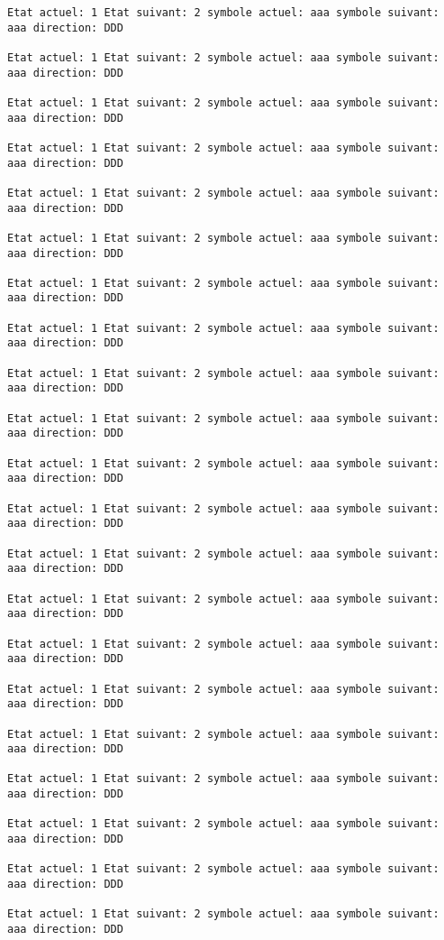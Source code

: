 \documentclass{article}
\begin{document}
\begin{verbatim}
Etat actuel: 1 Etat suivant: 2 symbole actuel: aaa symbole suivant: aaa direction: DDD

Etat actuel: 1 Etat suivant: 2 symbole actuel: aaa symbole suivant: aaa direction: DDD

Etat actuel: 1 Etat suivant: 2 symbole actuel: aaa symbole suivant: aaa direction: DDD

Etat actuel: 1 Etat suivant: 2 symbole actuel: aaa symbole suivant: aaa direction: DDD

Etat actuel: 1 Etat suivant: 2 symbole actuel: aaa symbole suivant: aaa direction: DDD

Etat actuel: 1 Etat suivant: 2 symbole actuel: aaa symbole suivant: aaa direction: DDD

Etat actuel: 1 Etat suivant: 2 symbole actuel: aaa symbole suivant: aaa direction: DDD

Etat actuel: 1 Etat suivant: 2 symbole actuel: aaa symbole suivant: aaa direction: DDD

Etat actuel: 1 Etat suivant: 2 symbole actuel: aaa symbole suivant: aaa direction: DDD

Etat actuel: 1 Etat suivant: 2 symbole actuel: aaa symbole suivant: aaa direction: DDD

Etat actuel: 1 Etat suivant: 2 symbole actuel: aaa symbole suivant: aaa direction: DDD

Etat actuel: 1 Etat suivant: 2 symbole actuel: aaa symbole suivant: aaa direction: DDD

Etat actuel: 1 Etat suivant: 2 symbole actuel: aaa symbole suivant: aaa direction: DDD

Etat actuel: 1 Etat suivant: 2 symbole actuel: aaa symbole suivant: aaa direction: DDD

Etat actuel: 1 Etat suivant: 2 symbole actuel: aaa symbole suivant: aaa direction: DDD

Etat actuel: 1 Etat suivant: 2 symbole actuel: aaa symbole suivant: aaa direction: DDD

Etat actuel: 1 Etat suivant: 2 symbole actuel: aaa symbole suivant: aaa direction: DDD

Etat actuel: 1 Etat suivant: 2 symbole actuel: aaa symbole suivant: aaa direction: DDD

Etat actuel: 1 Etat suivant: 2 symbole actuel: aaa symbole suivant: aaa direction: DDD

Etat actuel: 1 Etat suivant: 2 symbole actuel: aaa symbole suivant: aaa direction: DDD

Etat actuel: 1 Etat suivant: 2 symbole actuel: aaa symbole suivant: aaa direction: DDD


\end{verbatim}
\end{document}
